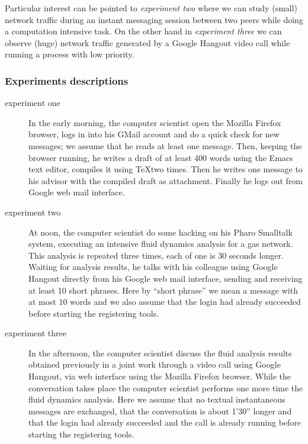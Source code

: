 \documentclass[10pt,a4paper]{article}
\begin{document}
    Particular interest can be pointed to \emph{experiment two} where
    we can study (small) network traffic during an instant messaging
    session between two peers while doing a computation intensive
    task. On the other hand in \emph{experiment three} we can observe
    (huge) network traffic generated by a Google Hangout video call
    while running a process with low priority.

    \subsubsection*{Experiments descriptions}
    
    \begin{description}
    \item[experiment one] In the early morning, the computer scientist
      open the Mozilla Firefox browser, logs in into his GMail account
      and do a quick check for new messages; we assume that he reads
      at least one message. Then, keeping the browser running, he
      writes a draft of at least 400 words using the Emacs text
      editor, compiles it using \TeX two times. Then he writes one
      message to his advisor with the compiled draft as
      attachment. Finally he logs out from Google web mail interface.
    \item[experiment two] At noon, the computer scientist do some
      hacking on his Pharo Smalltalk system, executing an intensive
      fluid dynamics analysis for a gas network. This analysis is
      repeated three times, each of one is 30 seconds longer. Waiting
      for analysis results, he talks with his colleague using Google
      Hangout directly from his Google web mail interface, sending and
      receiving at least 10 short phrases. Here by ``short phrase'' we
      mean a message with at most 10 words and we also assume that the
      login had already succeeded before starting the registering
      tools.
    \item[experiment three] In the afternoon, the computer scientist
      discuss the fluid analysis results obtained previously in a
      joint work through a video call using Google Hangout, via web
      interface using the Mozilla Firefox browser. While the
      conversation takes place the computer scientist performs one
      more time the fluid dynamics analysis. Here we assume that no
      textual instantaneous messages are exchanged, that the
      conversation is about 1'30'' longer and that the login had
      already succeeded and the call is already running before
      starting the registering tools.
    \end{description}
\end{document}
